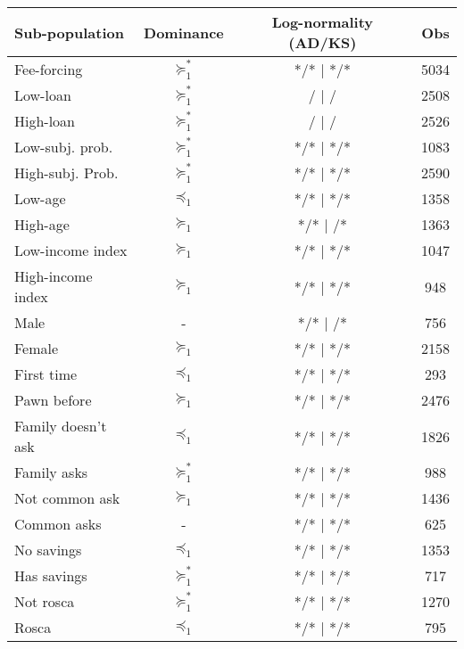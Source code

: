 \begin{tabular}{lccc}
\toprule
Sub-population & Dominance & Log-normality (AD/KS) & Obs \\
\midrule
\midrule
Fee-forcing & \cellcolor[rgb]{ .557,  .663,  .859} $\succeq_{1}^*$ & */*  |  */* & 5034 \\
Low-loan & $\succeq_{1}^*$ &    /     |     /    & 2508 \\
High-loan & $\succeq_{1}^*$ &    /     |     /    & 2526 \\
Low-subj. prob. & \cellcolor[rgb]{ .557,  .663,  .859} $\succeq_{1}^*$ & */*  |  */* & 1083 \\
High-subj. Prob. & \cellcolor[rgb]{ .557,  .663,  .859} $\succeq_{1}^*$ & */*  |  */* & 2590 \\
Low-age & $\preceq_{1}$ & */*  |  */* & 1358 \\
High-age & \cellcolor[rgb]{ .851,  .882,  .949} $\succeq_{1}$ & */*  |     /* & 1363 \\
Low-income index & \cellcolor[rgb]{ .851,  .882,  .949} $\succeq_{1}$ & */*  |  */* & 1047 \\
High-income index & \cellcolor[rgb]{ .851,  .882,  .949} $\succeq_{1}$ & */*  |  */* & 948 \\
Male  & -     & */*  |     /* & 756 \\
Female & \cellcolor[rgb]{ .851,  .882,  .949} $\succeq_{1}$ & */*  |  */* & 2158 \\
First time & $\preceq_{1}$ & */*  |  */* & 293 \\
Pawn before & \cellcolor[rgb]{ .851,  .882,  .949} $\succeq_{1}$ & */*  |  */* & 2476 \\
Family doesn't ask & $\preceq_{1}$ & */*  |  */* & 1826 \\
Family asks & \cellcolor[rgb]{ .557,  .663,  .859} $\succeq_{1}^*$ & */*  |  */* & 988 \\
Not common ask & \cellcolor[rgb]{ .851,  .882,  .949} $\succeq_{1}$ & */*  |  */* & 1436 \\
Common asks & -     & */*  |  */* & 625 \\
No savings & $\preceq_{1}$ & */*  |  */* & 1353 \\
Has savings & \cellcolor[rgb]{ .557,  .663,  .859} $\succeq_{1}^*$ & */*  |  */* & 717 \\
Not rosca & \cellcolor[rgb]{ .557,  .663,  .859} $\succeq_{1}^*$ & */*  |  */* & 1270 \\
Rosca & $\preceq_{1}$ & */*  |  */* & 795 \\

\end{tabular}
